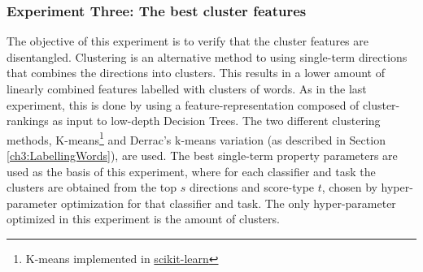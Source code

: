 \subsubsection{Experiment Three: The best cluster features}

The objective of this experiment is to verify that the cluster features are disentangled. Clustering is an alternative method to using single-term directions that combines the directions into clusters. This results in a lower amount of linearly combined features labelled with clusters of words. As in the last experiment, this is done by using a feature-representation composed of cluster-rankings as input to low-depth Decision Trees.  The two different clustering methods,  K-means\footnote{K-means implemented in \href{https://scikit-learn.org/stable/modules/generated/sklearn.cluster.MiniBatchKMeans.html}{scikit-learn}} and Derrac's k-means variation (as described in Section \ref{ch3:LabellingWords}), are used. The best single-term property parameters are used as the basis of this experiment, where for each classifier and task the clusters are obtained from the top $s$ directions and score-type $t$,  chosen by hyper-parameter optimization for that classifier and task. The only hyper-parameter optimized in this experiment is the amount of clusters.






